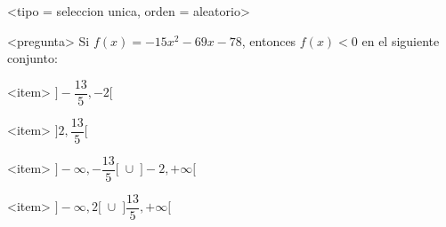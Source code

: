 <tipo = seleccion unica, orden = aleatorio>

<pregunta>
Si $f(x) = -15x^2 -69x -78$, entonces $f(x) < 0$ en el siguiente conjunto:


<item>
$\bigg]-\dfrac{13}{5}, -2\bigg[$

<item>
$\bigg]2, \dfrac{13}{5}\bigg[$

<item>
$\bigg]{-}\infty, -\dfrac{13}{5}\bigg[\;\cup\; \bigg]-2,+\infty\bigg[$

<item>
$\bigg]{-}\infty, 2\bigg[\;\cup\; \bigg]\dfrac{13}{5},+\infty\bigg[$

 

